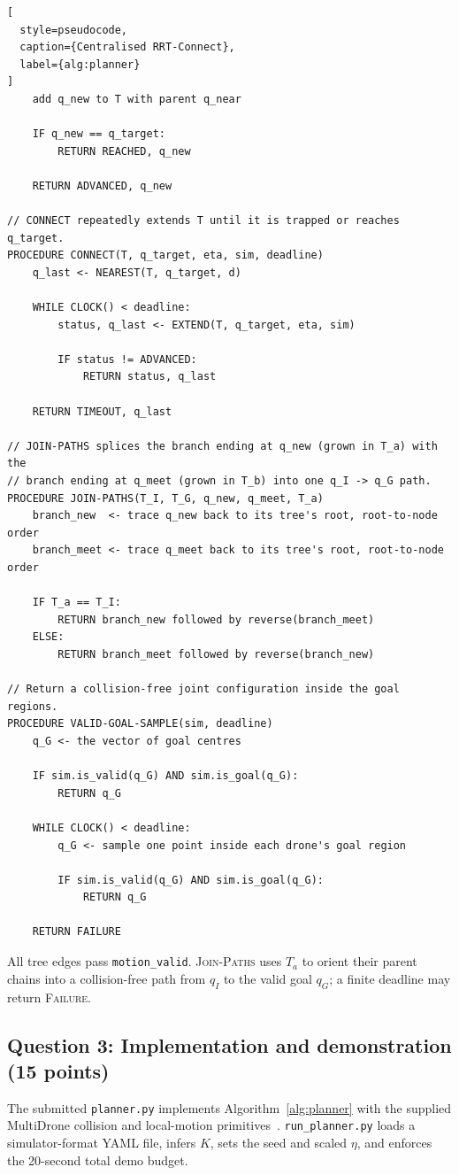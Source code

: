 \documentclass[11pt,a4paper]{article}
\begin{document}
\begin{lstlisting}[
  style=pseudocode,
  caption={Centralised RRT-Connect},
  label={alg:planner}
]
    add q_new to T with parent q_near

    IF q_new == q_target:
        RETURN REACHED, q_new

    RETURN ADVANCED, q_new

// CONNECT repeatedly extends T until it is trapped or reaches q_target.
PROCEDURE CONNECT(T, q_target, eta, sim, deadline)
    q_last <- NEAREST(T, q_target, d)

    WHILE CLOCK() < deadline:
        status, q_last <- EXTEND(T, q_target, eta, sim)

        IF status != ADVANCED:
            RETURN status, q_last

    RETURN TIMEOUT, q_last

// JOIN-PATHS splices the branch ending at q_new (grown in T_a) with the
// branch ending at q_meet (grown in T_b) into one q_I -> q_G path.
PROCEDURE JOIN-PATHS(T_I, T_G, q_new, q_meet, T_a)
    branch_new  <- trace q_new back to its tree's root, root-to-node order
    branch_meet <- trace q_meet back to its tree's root, root-to-node order

    IF T_a == T_I:
        RETURN branch_new followed by reverse(branch_meet)
    ELSE:
        RETURN branch_meet followed by reverse(branch_new)

// Return a collision-free joint configuration inside the goal regions.
PROCEDURE VALID-GOAL-SAMPLE(sim, deadline)
    q_G <- the vector of goal centres

    IF sim.is_valid(q_G) AND sim.is_goal(q_G):
        RETURN q_G

    WHILE CLOCK() < deadline:
        q_G <- sample one point inside each drone's goal region

        IF sim.is_valid(q_G) AND sim.is_goal(q_G):
            RETURN q_G

    RETURN FAILURE
\end{lstlisting}

\noindent
All tree edges pass \texttt{motion\_valid}.  \textsc{Join-Paths} uses $T_a$ to
orient their parent chains into a collision-free path from $q_I$ to the valid
goal $q_G$; a finite deadline may return \textsc{Failure}.

\subsection*{Question 3: Implementation and demonstration (15 points)}

The submitted \texttt{planner.py} implements Algorithm~\ref{alg:planner} with
the supplied MultiDrone collision and local-motion primitives~\cite{multidrone}.
\texttt{run\_planner.py} loads a simulator-format YAML file, infers $K$, sets
the seed and scaled $\eta$, and enforces the 20-second total demo budget.
\end{document}
